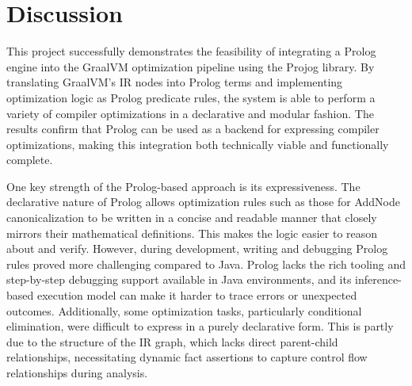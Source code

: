 \chapter[Discussion]{Discussion}
This project successfully demonstrates the feasibility of integrating a Prolog engine into the GraalVM optimization pipeline using the Projog library. By translating GraalVM’s IR nodes into Prolog terms and implementing optimization logic as Prolog predicate rules, the system is able to perform a variety of compiler optimizations in a declarative and modular fashion. The results confirm that Prolog can be used as a backend for expressing compiler optimizations, making this integration both technically viable and functionally complete.

One key strength of the Prolog-based approach is its expressiveness. The declarative nature of Prolog allows optimization rules such as those for AddNode canonicalization to be written in a concise and readable manner that closely mirrors their mathematical definitions. This makes the logic easier to reason about and verify. However, during development, writing and debugging Prolog rules proved more challenging compared to Java. Prolog lacks the rich tooling and step-by-step debugging support available in Java environments, and its inference-based execution model can make it harder to trace errors or unexpected outcomes. Additionally, some optimization tasks, particularly conditional elimination, were difficult to express in a purely declarative form. This is partly due to the structure of the IR graph, which lacks direct parent-child relationships, necessitating dynamic fact assertions to capture control flow relationships during analysis.

